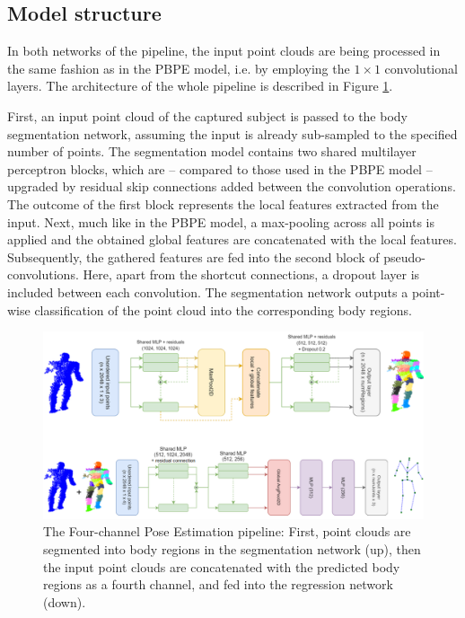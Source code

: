 \subsection{Model structure}
In both networks of the pipeline, the input point clouds are being processed in the same fashion as in the PBPE model, i.e. by employing the $1 \times 1$ convolutional layers. The architecture of the whole pipeline is described in Figure \ref{fig:4chan_pipeline}.\par
\vspace{5mm}
\noindent First, an input point cloud of the captured subject is passed to the body segmentation network, assuming the input is already sub-sampled to the specified number of points. The segmentation model contains two shared multilayer perceptron blocks, which are – compared to those used in the PBPE model – upgraded by residual skip connections added between the convolution operations. The outcome of the first block represents the local features extracted from the input. Next, much like in the PBPE model, a max-pooling across all points is applied and the obtained global features are concatenated with the local features. Subsequently, the gathered features are fed into the second block of pseudo-convolutions. Here, apart from the shortcut connections, a dropout layer is included between each convolution. The segmentation network outputs a point-wise classification of the point cloud into the corresponding body regions.\par
\vspace{5mm}
\vspace{5mm}
\begin{figure}[H]
\begin{center}
  \includegraphics[width=\textwidth]{images/implementation/4chan_pipeline_fixed.png}
  \caption[The Four-channel Pose Estimation pipeline.]{ The Four-channel Pose Estimation pipeline: First, point clouds are segmented into body regions in the segmentation network (up), then the input point clouds are concatenated with the predicted body regions as a fourth channel, and fed into the regression network (down).}
  \label{fig:4chan_pipeline}
\end{center}
\end{figure}

